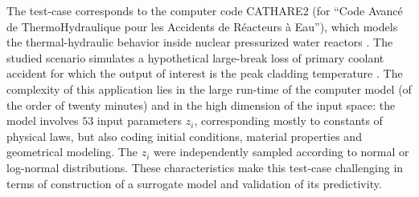 The test-case corresponds to the computer code CATHARE2 (for ``Code Avanc\'e de ThermoHydraulique pour les Accidents de R\'eacteurs \`a Eau''), which models the thermal-hydraulic behavior inside nuclear pressurized water reactors \citep{gefant11}. 
The studied scenario simulates a hypothetical large-break loss of primary coolant accident for which the output of interest is the peak cladding temperature \citep{decbaz08,ioobou10}. 
The complexity of this application lies in the large run-time of the computer model (of the order of twenty minutes) and in the high dimension of the input space: the model involves $53$ input parameters $z_i$, corresponding mostly to constants of physical laws, but also coding initial conditions, material properties and geometrical modeling. 
The $z_i$ were independently sampled according to normal or log-normal distributions. %
These characteristics make this test-case challenging in terms of construction of a surrogate model and validation of its predictivity.


